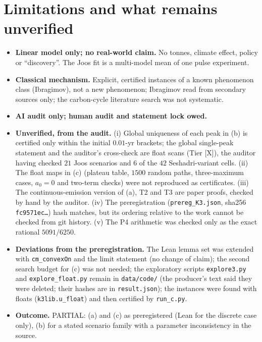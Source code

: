 \documentclass[10pt]{article}
\newcommand{\tier}[1]{\textsf{[#1]}}
\newcommand{\tX}{\tier{X}}
\newcommand{\lean}[1]{\texttt{#1}}
\theoremstyle{plain}
\begin{document}
\section{Limitations and what remains unverified}\label{sec:lim}
\begin{itemize}\itemsep=1pt
\item \textbf{Linear model only; no real-world claim.} No tonnes, climate effect, policy or ``discovery''. The Joos fit is a multi-model mean of one pulse experiment.
\item \textbf{Classical mechanism.} Explicit, certified instances of a known phenomenon class (Ibragimov), not a new phenomenon; Ibragimov read from secondary sources only; the carbon-cycle literature search was not systematic.
\item \textbf{AI audit only; human audit and statement lock owed.}
\item \textbf{Unverified, from the audit.} (i) Global uniqueness of each peak in (b) is certified only within the initial $0.01$-yr brackets; the global single-peak statement and the auditor's cross-check are float scans (Tier \tX{}), the auditor having checked $21$ Joos scenarios and $6$ of the $42$ Seshadri-variant cells. (ii) The float maps in (c) (plateau table, $1500$ random paths, three-maximum cases, $a_0=0$ and two-term checks) were not reproduced as certificates. (iii) The continuous-emission version of (a), T2 and T3 are paper proofs, checked by hand by the auditor. (iv) The preregistration (\texttt{prereg\_K3.json}, sha256 \texttt{fc9571ec\dots}) hash matches, but its ordering relative to the work cannot be checked from git history. (v) The P4 arithmetic was checked only as the exact rational $5091/6250$.
\item \textbf{Deviations from the preregistration.} The Lean lemma set was extended with \lean{cm\_convexOn} and the limit statement (no change of claim); the second search budget for (c) was not needed; the exploratory scripts \texttt{explore3.py} and \texttt{explore\_float.py} remain in \texttt{data/code/} (the producer's text said they were deleted; their hashes are in \texttt{result.json}); the instances were found with floats (\texttt{k3lib.u\_float}) and then certified by \texttt{run\_c.py}.
\item \textbf{Outcome.} PARTIAL: (a) and (c) as preregistered (Lean for the discrete case only), (b) for a stated scenario family with a parameter inconsistency in the source.
\end{itemize}

\end{document}
